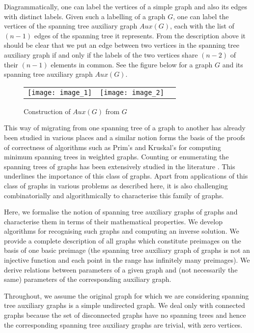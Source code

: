 \documentclass{llncs}
\begin{document}
Diagrammatically, one can label the vertices of a simple graph and also its edges with distinct labels. Given such a labelling of a graph $G$, one can label the vertices of the spanning tree auxiliary graph $Aux(G)$, each with the list of $(n-1)$ edges of the spanning tree it represents. From the description above it should be clear that we put an edge between two vertices in the spanning tree auxiliary graph if and only if the labels of the two vertices share $(n-2)$ of their $(n-1)$ elements in common. See the figure below for a graph $G$ and its spanning tree auxiliary graph $Aux(G)$. 


	\begin{figure}[htb]
		\centering
		\begin{tabular}{@{}cccc@{}}
			\texttt{[image: image\_1]} &
			\multicolumn{2}{c}{\texttt{[image: image\_2]}}
		\end{tabular}
		\caption{Construction of $Aux(G)$ from $G$}
	\end{figure}
	

This way of migrating from one spanning tree of a graph to another has already been studied in various places and a similar notion forms the basis of the proofs of correctness of algorithms such as Prim's and Kruskal's \cite{kruskal1956shortest} for computing minimum spanning trees in weighted graphs. Counting or enumerating the spanning trees of graphs has been extensively studied in the literature \cite{chaiken1978matrix} \cite{kapoor1995algorithms} \cite{shioura1997optimal}. This underlines the importance of this class of graphs. Apart from applications of this class of graphs in various problems as described here, it is also challenging combinatorially and algorithmically to characterise  this family of graphs.

Here, we formalise the notion of spanning tree auxiliary graphs of graphs and characterise them in terms of their mathematical properties. We develop algorithms for recognising such graphs and computing an inverse solution. We provide a complete description of all graphs which constitute preimages on the basis of one basic preimage (the spanning tree auxiliary graph of graphs is not an injective function and each point in the range has infinitely many preimages). We derive relations between parameters of a given graph and (not necessarily the same) parameters of the corresponding auxiliary graph. 

Throughout, we assume the original graph for which we are considering spanning tree auxiliary graphs is a simple undirected graph. We deal only with connected graphs because the set of disconnected graphs have no spanning trees and hence the corresponding spanning tree auxiliary graphs are trivial, with zero vertices.
\end{document}

